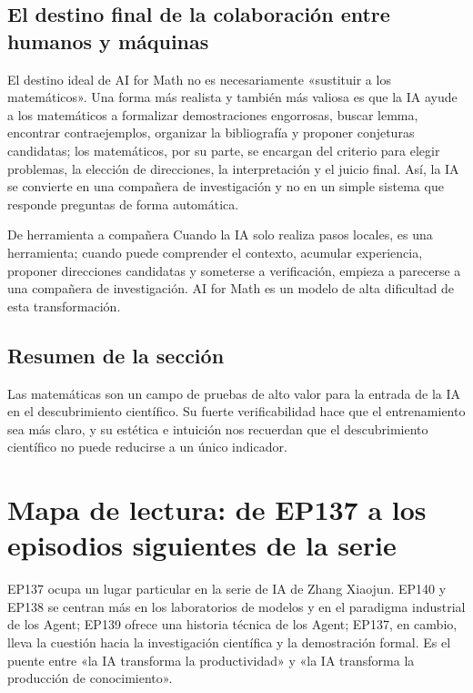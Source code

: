 \documentclass[a4paper]{article}
\begin{document}
\subsection{El destino final de la colaboración entre humanos y máquinas}

El destino ideal de AI for Math no es necesariamente «sustituir a los matemáticos». Una forma más realista y también más valiosa es que la IA ayude a los matemáticos a formalizar demostraciones engorrosas, buscar lemma, encontrar contraejemplos, organizar la bibliografía y proponer conjeturas candidatas; los matemáticos, por su parte, se encargan del criterio para elegir problemas, la elección de direcciones, la interpretación y el juicio final. Así, la IA se convierte en una compañera de investigación y no en un simple sistema que responde preguntas de forma automática.

\begin{importantbox}{De herramienta a compañera}
Cuando la IA solo realiza pasos locales, es una herramienta; cuando puede comprender el contexto, acumular experiencia, proponer direcciones candidatas y someterse a verificación, empieza a parecerse a una compañera de investigación. AI for Math es un modelo de alta dificultad de esta transformación.
\end{importantbox}

\subsection{Resumen de la sección}

Las matemáticas son un campo de pruebas de alto valor para la entrada de la IA en el descubrimiento científico. Su fuerte verificabilidad hace que el entrenamiento sea más claro, y su estética e intuición nos recuerdan que el descubrimiento científico no puede reducirse a un único indicador.
\section{Mapa de lectura: de EP137 a los episodios siguientes de la serie}

EP137 ocupa un lugar particular en la serie de IA de Zhang Xiaojun. EP140 y EP138 se centran más en los laboratorios de modelos y en el paradigma industrial de los Agent; EP139 ofrece una historia técnica de los Agent; EP137, en cambio, lleva la cuestión hacia la investigación científica y la demostración formal. Es el puente entre «la IA transforma la productividad» y «la IA transforma la producción de conocimiento».
\end{document}
